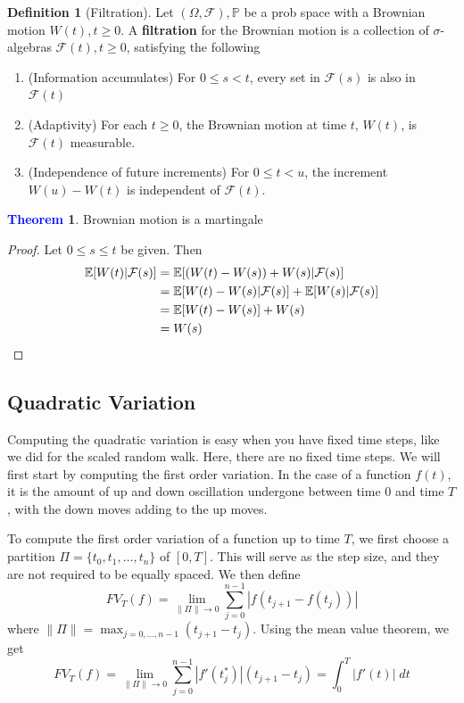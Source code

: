 \documentclass[11pt]{article}
\theoremstyle{definition}
\theoremstyle{definition}
\newtheorem{theorem}{\textcolor{blue}{Theorem}}
\theoremstyle{definition}
\newtheorem{definition}{\textcolor{OliveGreen}{Definition}}
\theoremstyle{remark}
\begin{document}
\begin{definition}[Filtration]
    Let $(\Omega, \mathcal{F}), \mathbb{P}$ be a prob space with a Brownian motion $W(t), t \geq 0$. A \textbf{filtration}
    for the Brownian motion is a collection of $\sigma$-algebras $\mathcal{F}(t), t \geq 0$, satisfying the following
    \begin{enumerate}
        \item (Information accumulates) For $0 \leq s < t$, every set in $\mathcal{F}(s)$ is also in $\mathcal{F}(t)$  
        \item (Adaptivity) For each $t \geq 0$, the Brownian motion at time $t$, $W(t)$, is $\mathcal{F}(t)$ measurable.    
        \item (Independence of future increments) For $0 \leq t < u$, the increment $W(u) - W(t)$ is independent of $\mathcal{F}(t)$.   
    \end{enumerate}  
\end{definition}

\begin{theorem}
    Brownian motion is a martingale
\end{theorem}
\begin{proof}
    Let $0 \leq s \leq t$ be given. Then
    \begin{align*}
        \mathbb{E}[W(t) | \mathcal{F}(s)] &= \mathbb{E}[(W(t) - W(s)) + W(s) | \mathcal{F}(s)] \\
        &= \mathbb{E}[W(t) - W(s) | \mathcal{F}(s)] + \mathbb{E}[W(s) | \mathcal{F}(s)] \\
        &= \mathbb{E}[W(t) - W(s)] + W(s) \\
        &= W(s) \qedhere
    \end{align*}
\end{proof}

\subsection{Quadratic Variation}

Computing the quadratic variation is easy when you have fixed time steps, like we did for the scaled random walk.
Here, there are no fixed time steps. We will first start by computing the first order variation. In the case of a function
$f(t)$, it is the amount of up and down oscillation undergone between time $0$ and time $T$, with the down moves
adding to the up moves.

To compute the first order variation of a function up to time $T$, we first choose a partition $\Pi= \{t_0, t_1, \dots, t_n\}$
of $[0, T]$. This will serve as the step size, and they are not required to be equally spaced. We then define
\[
    FV_T(f) = \lim_{\| \Pi \| \to 0 } \sum_{j = 0}^{n - 1} |f(t_{j + 1} - f(t_j))| 
\]    
where $\| \Pi \| = \max_{j = 0, \dots, n - 1} (t_{j + 1} - t_j)$. Using the mean value theorem, we get
\[
    FV_T(f) = \lim_{\| \Pi \| \to 0 } \sum_{j = 0}^{n - 1} |f'(t_j^*)|(t_{j + 1} - t_j) = \int_0^T |f'(t)| \; dt
\] 
\end{document}
